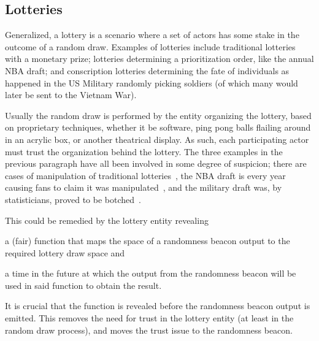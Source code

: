 \subsection{Lotteries}\label{subsec:usecase_lotteries}
Generalized, a lottery is a scenario where a set of actors has some stake in the outcome of a random draw.
Examples of lotteries include traditional lotteries with a monetary prize; lotteries determining a prioritization order, like the annual NBA draft; and conscription lotteries determining the fate of individuals as happened in the US Military randomly picking soldiers (of which many would later be sent to the Vietnam War).

Usually the random draw is performed by the entity organizing the lottery, based on proprietary techniques, whether it be software, ping pong balls flailing around in an acrylic box, or another theatrical display.
As such, each participating actor must trust the organization behind the lottery.
The three examples in the previous paragraph have all been involved in some degree of suspicion; there are cases of manipulation of traditional lotteries~\cite{lotteryscandal-eddietipton, lotteryscandal-666}, the NBA draft is every year causing fans to claim it was manipulated~\cite{nbalottery}, and the military draft was, by statisticians, proved to be botched~\cite{starr1997nonrandom}.

This could be remedied by the lottery entity revealing
\begin{eromanate*}
    \item a (fair) function that maps the space of a randomness beacon output to the required lottery draw space and
    \item a time in the future at which the output from the randomness beacon will be used in said function to obtain the result.
\end{eromanate*}
It is crucial that the function is revealed before the randomness beacon output is emitted.
This removes the need for trust in the lottery entity (at least in the random draw process), and moves the trust issue to the randomness beacon.

